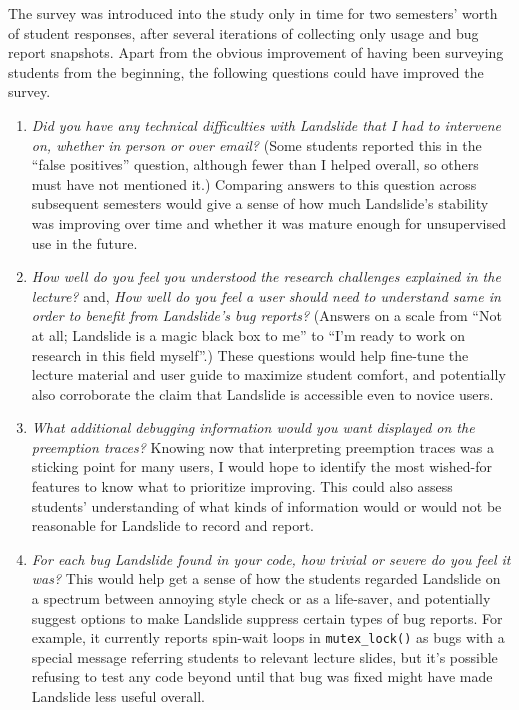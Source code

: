 The survey was introduced into the study only in time for two semesters' worth of student responses,
after several iterations of collecting only usage and bug report snapshots.
Apart from the obvious improvement of having been surveying students from the beginning,
the following questions could have improved the survey.
\begin{enumerate}
	\item {\em Did you have any technical difficulties with Landslide that I had to intervene on,
		whether in person or over email?}
		(Some students reported this in the ``false positives'' question,
		although fewer than I helped overall, so others must have not mentioned it.)
		Comparing answers to this question across subsequent semesters would give a sense
		of how much Landslide's stability was improving over time
		and whether it was mature enough for unsupervised use in the future.
	\item {\em How well do you feel you understood the research challenges explained in the lecture?}
		and,
		{\em How well do you feel a user should need to understand same in order to benefit from Landslide's bug reports?}
		(Answers on a scale from ``Not at all; Landslide is a magic black box to me''
		to ``I'm ready to work on research in this field myself''.)
		These questions would help fine-tune the lecture material and user guide to maximize student comfort,
		and potentially also corroborate the claim that Landslide is accessible even to novice users.
	\item {\em What additional debugging information would you want displayed on the preemption traces?}
		Knowing now that interpreting preemption traces was a sticking point for many users,
		I would hope to identify the most wished-for features to know what to prioritize improving.
		This could also assess students' understanding of what kinds of information
		would or would not be reasonable for Landslide to record and report.
	\item {\em For each bug Landslide found in your code, how trivial or severe do you feel it was?}
		This would help get a sense of how the students regarded Landslide
		on a spectrum between annoying style check or as a life-saver,
		and potentially suggest options to make Landslide suppress certain types of bug reports.
		For example, it currently reports spin-wait loops in {\tt mutex\_lock()} as bugs
		with a special message referring students to relevant lecture slides,
		but it's possible refusing to test any code beyond until that bug was fixed
		might have made Landslide less useful overall.
\end{enumerate}

